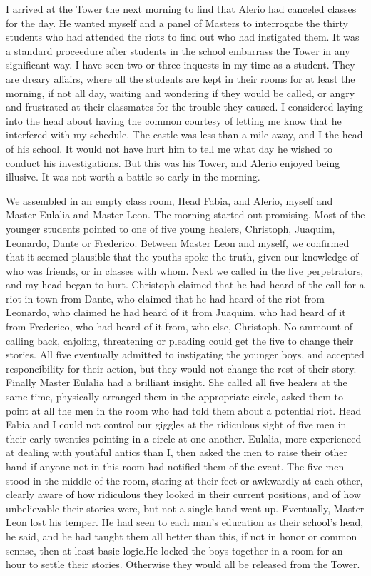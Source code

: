 \documentclass{article}
\begin{document}
I arrived at the Tower the next morning to find that Alerio had canceled classes for the day. He wanted myself and a panel of Masters to interrogate the thirty students who had attended the riots to find out who had instigated them. It was a standard proceedure after students in the school embarrass the Tower in any significant way. I have seen two or three inquests in my time as a student. They are dreary affairs, where all the students are kept in their rooms for at least the morning, if not all day, waiting and wondering if they would be called, or angry and frustrated at their classmates for the trouble they caused. I considered laying into the head about having the common courtesy of letting me know that he interfered with my schedule. The castle was less than a mile away, and I the head of his school. It would not have hurt him to tell me what day he wished to conduct his investigations. But this was his Tower, and Alerio enjoyed being illusive. It was not worth a battle so early in the morning. 

We assembled in an empty class room, Head Fabia, and Alerio, myself and Master Eulalia and Master Leon. The morning started out promising. Most of the younger students pointed to one of five young healers, Christoph, Juaquim, Leonardo, Dante or Frederico. Between Master Leon and myself, we confirmed that it seemed plausible that the youths spoke the truth, given our knowledge of who was friends, or in classes with whom. Next we called in the five perpetrators, and my head began to hurt. Christoph claimed that he had heard of the call for a riot in town from Dante, who claimed that he had heard of the riot from Leonardo, who claimed he had heard of it from Juaquim, who had heard of it from Frederico, who had heard of it from, who else, Christoph. No ammount of calling back, cajoling, threatening or pleading could get the five to change their stories. All five eventually admitted to instigating the younger boys, and accepted responcibility for their action, but they would not change the rest of their story. Finally Master Eulalia had a brilliant insight. She called all five healers at the same time, physically arranged them in the appropriate circle, asked them to point at all the men in the room who had told them about a potential riot. Head Fabia and I could not control our giggles at the ridiculous sight of five men in their early twenties pointing in a circle at one another. Eulalia, more experienced at dealing with youthful antics than I, then asked the men to raise their other hand if anyone not in this room had notified them of the event. The five men stood in the middle of the room, staring at their feet or awkwardly at each other, clearly aware of how ridiculous they looked in their current positions, and of how unbelievable their stories were, but not a single hand went up. Eventually, Master Leon lost his temper. He had seen to each man's education as their school's head, he said, and he had taught them all better than this, if not in honor or common sennse, then at least basic logic.He locked the boys together in a room for an hour to settle their stories. Otherwise they would all be released from the Tower.
\end{document}
